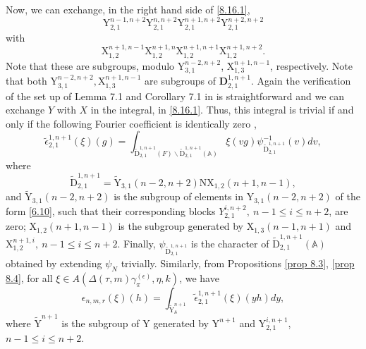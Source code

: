 \documentclass[12pts]{amsart}
\newcommand{\BA}{{\mathbb {A}}}
\begin{document}
Now, we can exchange, in the right hand side of \eqref{8.16.1},
\begin{equation}\label{8.22}
\mathrm{Y}_{2,1}^{n-1,n+2}\mathrm{Y}_{2,1}^{n,n+2}\mathrm{Y}_{2,1}^{n+1,n+2}\mathrm{Y}_{2,1}^{n+2,n+2}
\end{equation}
with
\begin{equation}\label{8.23}
\mathrm{X}_{1,2}^{n+1,n-1}\mathrm{X}_{1,2}^{n+1,n}\mathrm{X}_{1,2}^{n+1,n+1}\mathrm{X}_{1,2}^{n+1,n+2}.
\end{equation}
Note that these are subgroups, modulo  $\mathrm{Y}_{3,1}^{n-2,n+2}$, $\mathrm{X}_{1,3}^{n+1,n-1}$, respectively.
 Note that both $\mathrm{Y}_{3,1}^{n-2,n+2},
\mathrm{X}_{1,3}^{n+1,n-1}$ are subgroups of
$\mathbf{D}_{2,1}^{1,n+1}$. Again the verification of the set up of
Lemma 7.1 and Corollary 7.1 in \cite{GRS11} is straightforward and
we can exchange $Y$ with $X$ in the integral, in \eqref{8.16.1}. Thus,
this integral is trivial if and only if the following Fourier
coefficient is identically zero ,
\begin{equation}\label{8.24}
\widetilde{\epsilon}_{2,1}^{1,n+1}(\xi)(g)=\int_{\widetilde{\mathrm{D}}_{2,1}^{1,n+1}(F)\backslash
	\widetilde{\mathrm{D}}_{2,1}^{1,n+1}(\BA)}\xi(vg)\psi_{\widetilde{\mathrm{D}}_{2,1}^{1,n+1}}^{-1}(v)dv,
\end{equation}
where
\begin{equation}\label{8.25}
\widetilde{\mathrm{D}}_{2,1}^{1,n+1}=\widetilde{\mathrm{Y}}_{3,1}(n-2,n+2)\mathrm{N}\mathrm{X}_{1,2}(n+1,n-1),
\end{equation}
and $\widetilde{\mathrm{Y}}_{3,1}(n-2,n+2)$ is the subgroup of
elements in $\mathrm{Y}_{3,1}(n-2,n+2)$ of the form \eqref{6.10},
such that their corresponding blocks $Y_{2,1}^{i,n+2},\ n-1\leq
i\leq n+2$, are zero; $\mathrm{X}_{1,2}(n+1,n-1)$ is the subgroup
generated by $\mathrm{X}_{1,3}(n-1,n+1)$ and
$\mathrm{X}_{1,2}^{n+1,i},\ n-1\leq i\leq n+2$. Finally,
$\psi_{\widetilde{\mathrm{D}}_{2,1}^{1,n+1}}$ is the character of
$\widetilde{\mathrm{D}}_{2,1}^{1,n+1}(\BA)$ obtained by extending
$\psi_N$ trivially. Similarly, from Propositions \ref{prop 8.3}, \ref{prop 8.4},
	for all $\xi\in A(\Delta(\tau,m)\gamma_\pi^{(\epsilon)},\eta,k)$, we have
\begin{equation}\label{8.25.1}
\epsilon_{n,m,r}(\xi)(h)=\int_{\widetilde{\mathrm{Y}}^{n+1}_\BA}\tilde{\epsilon}_{2,1}^{1,n+1}(\xi)(yh)dy,
\end{equation}
where $\widetilde{\mathrm{Y}}^{n+1}$ is the subgroup of $\mathrm{Y}$ generated by $\mathrm{Y}^{n+1}$ and $\mathrm{Y}_{2,1}^{i,n+1}$, $n-1\leq i\leq n+2$.
\end{document}
